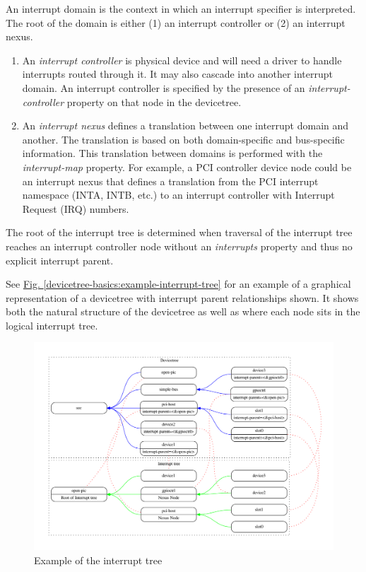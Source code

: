 \documentclass[a4paper,10pt,oneside]{sphinxmanual}
\begin{document}
An interrupt domain is the context in which an interrupt specifier is
interpreted. The root of the domain is either (1) an interrupt
controller or (2) an interrupt nexus.
\begin{enumerate}
\item {} 
An \emph{interrupt controller} is physical device and will need a driver
to handle interrupts routed through it. It may also cascade into
another interrupt domain. An interrupt controller is specified by the
presence of an \emph{interrupt-controller} property on that node in the
devicetree.

\item {} 
An \emph{interrupt nexus} defines a translation between one interrupt
domain and another. The translation is based on both domain-specific
and bus-specific information. This translation between domains is
performed with the \emph{interrupt-map} property. For example, a PCI
controller device node could be an interrupt nexus that defines a
translation from the PCI interrupt namespace (INTA, INTB, etc.) to an
interrupt controller with Interrupt Request (IRQ) numbers.

\end{enumerate}

The root of the interrupt tree is determined when traversal of the
interrupt tree reaches an interrupt controller node without an
\emph{interrupts} property and thus no explicit interrupt parent.

See \hyperref[devicetree-basics:example-interrupt-tree]{Fig. \ref{devicetree-basics:example-interrupt-tree}} for an example of a graphical
representation of a devicetree with interrupt parent relationships shown. It
shows both the natural structure of the devicetree as well as where each node
sits in the logical interrupt tree.
\begin{figure}[htbp]
\centering
\capstart

\includegraphics{graphviz-1d3954672eca688030b49a13a35b6714d9abdcd5.pdf}
\caption{Example of the interrupt tree}\label{devicetree-basics:example-interrupt-tree}\label{devicetree-basics:id9}\end{figure}
\end{document}
